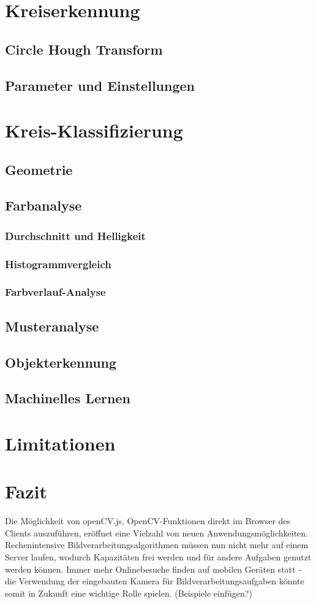 \documentclass{article}
\begin{document}
\section{Kreiserkennung}
\subsection{Circle Hough Transform}
\subsection{Parameter und Einstellungen}

\section{Kreis-Klassifizierung}
\subsection{Geometrie}
\subsection{Farbanalyse}
\subsubsection{Durchschnitt und Helligkeit}
\subsubsection{Histogrammvergleich}
\subsubsection{Farbverlauf-Analyse}
\subsection{Musteranalyse}
\subsection{Objekterkennung}
\subsection{Machinelles Lernen}

\section{Limitationen}

\section{Fazit}
Die Möglichkeit von openCV.js, OpenCV-Funktionen direkt im Browser des Clients auszuführen, eröffnet eine Vielzahl von neuen Anwendungsmöglichkeiten. Rechenintensive Bildverarbeitungsalgorithmen müssen nun nicht mehr auf einem Server laufen, wodurch Kapazitäten frei werden und für andere Aufgaben genutzt werden können. Immer mehr Onlinebesuche finden auf mobilen Geräten statt - die Verwendung der eingebauten Kamera für Bildverarbeitungsaufgaben könnte somit in Zukunft eine wichtige Rolle spielen. 
(Beispiele einfügen?)
\end{document}

